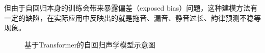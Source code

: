 但由于自回归本身的训练会带来暴露偏差（exposed bias）问题，这种建模方法有一定的缺陷，在实际应用中反映出的就是拖音、漏音、静音过长、韵律预测不稳等现象。
\begin{figure}[ht]
  \caption{基于Transformer的自回归声学模型示意图}
\end{figure}

